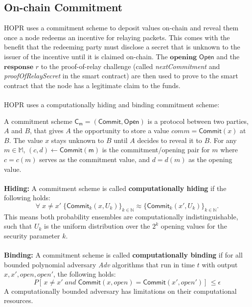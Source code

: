 \subsection{On-chain Commitment}
\label{sec:onchaincommitment}

HOPR uses a commitment scheme to deposit values on-chain and reveal them once a
node redeems an incentive for relaying packets. This comes with the benefit that
the redeeming party must disclose a secret that is unknown to the issuer of the
incentive until it is claimed on-chain. The $\textbf{opening}$ $\mathsf{Open}$
and the $\textbf{response}$ $r$ to the proof-of-relay challenge (called \textit{nextCommitment} and \textit{proofOfRelaySecret} in the smart contract) are then
used to prove to the smart contract that the node has a legitimate claim to the
funds. \\~\\HOPR uses a computationally hiding and binding commitment scheme:

\begin{defnsub}
    A commitment scheme $\mathsf{C_m} = (\mathsf{Commit}, \mathsf{Open})$ is a protocol between two parties, $A$ and $B$, that gives $A$ the opportunity to store a value $comm = \mathsf{Commit}(x)$ at $B$. The value $x$ stays unknown to $B$ until $A$ decides to reveal it to $B$.
    For any $m\in \mathbb{M}$, $(c,d)\leftarrow \mathsf{Commit(m)}$ is the commitment/opening pair for $m$ where $c = c(m)$ serves as the commitment value, and $d = d(m)$ as the opening value.
    \\~\\ \noindent\textbf{Hiding:} A commitment scheme is called \textbf{computationally hiding} if the following holds:
    $$\forall \;x\neq x' \; \{\mathsf{Commit}_k(x,U_k)\}_{k\in\mathbb{N}}\approx\{{\mathsf{Commit}_k(x',U_k)}\}_{k\in\mathbb{N}}.$$ This means both probability ensembles are computationally indistinguishable, such that $U_{k}$ is the uniform distribution over the $2^{k}$ opening values for the security parameter $k$.
    \\~\\\noindent\textbf{Binding:} A commitment scheme is called \textbf{computationally binding} if for all bounded polynomial adversary \textit{Adv} algorithms that run in time $t$ with output $x,x',open,open'$, the following holds:
    $$P	[ \,x\neq x' \; and \; \mathsf{Commit}(x,open)={\mathsf{Commit}(x',open')}] \,\leq \epsilon$$ A computationally bounded adversary has limitations on their computational resources. 

\end{defnsub}

